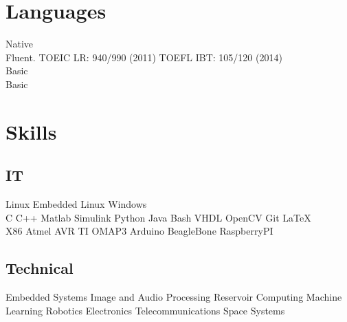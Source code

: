 \documentclass[a4paper]{deedy-resume} %
\begin{document}
\begin{minipage}[b]{0.25\linewidth}
	
\section{Languages}
\vspace{5pt}
Native\\
\vspace{4pt}
Fluent. TOEIC LR: 940/990 (2011) TOEFL IBT: 105/120 (2014)\\
\vspace{4pt}
Basic\\
\vspace{4pt}
Basic
\end{minipage}
\hfill
\begin{minipage}[b]{0.70\linewidth}
\section{Skills}
\vspace{5pt}
\subsection{IT}
\vspace{2pt}
Linux \textbullet{} Embedded Linux \textbullet{} Windows\\
\vspace{3pt}
C \textbullet{} C++ \textbullet{} Matlab \textbullet{} Simulink \textbullet{} Python \textbullet{} Java \textbullet{} Bash \textbullet{} VHDL \textbullet{} OpenCV \textbullet{} Git \textbullet{} \LaTeX\\
\vspace{3pt}
X86 \textbullet{} Atmel AVR \textbullet{} TI OMAP3 \textbullet{} Arduino \textbullet{} BeagleBone \textbullet{} RaspberryPI
\vspace{5pt}

\subsection{Technical}
Embedded Systems \textbullet{}
Image and Audio Processing \textbullet{} Reservoir Computing \textbullet{} Machine Learning \textbullet{} Robotics \textbullet{} Electronics \textbullet{} Telecommunications \textbullet{} Space Systems
\end{minipage}
\end{document}
